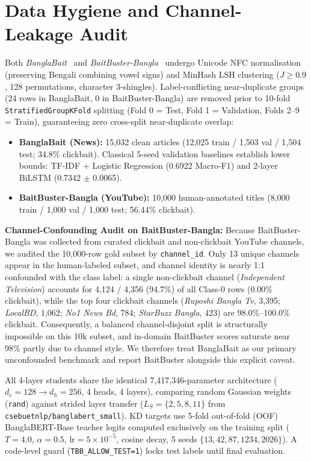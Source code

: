 \documentclass[conference]{IEEEtran}
\begin{document}
\section{Data Hygiene and Channel-Leakage Audit}
Both \textit{BanglaBait}~\cite{mahtab2023banglabait} and \textit{BaitBuster-Bangla}~\cite{alimran2024baitbuster} undergo Unicode NFC normalisation (preserving Bengali combining vowel signs) and MinHash LSH clustering ($J \ge 0.9$, 128 permutations, character 3-shingles). Label-conflicting near-duplicate groups (24 rows in BanglaBait, 0 in BaitBuster-Bangla) are removed prior to 10-fold \texttt{StratifiedGroupKFold} splitting (Fold 0 = Test, Fold 1 = Validation, Folds 2--9 = Train), guaranteeing zero cross-split near-duplicate overlap:
\begin{itemize}
    \item \textbf{BanglaBait (News):} 15,032 clean articles (12,025 train / 1,503 val / 1,504 test; 34.8\% clickbait). Classical 5-seed validation baselines establish lower bounds: TF-IDF + Logistic Regression (0.6922 Macro-F1) and 2-layer BiLSTM (0.7342 $\pm$ 0.0065).
    \item \textbf{BaitBuster-Bangla (YouTube):} 10,000 human-annotated titles (8,000 train / 1,000 val / 1,000 test; 56.44\% clickbait).
\end{itemize}
\textbf{Channel-Confounding Audit on BaitBuster-Bangla:} Because BaitBuster-Bangla was collected from curated clickbait and non-clickbait YouTube channels, we audited the 10,000-row gold subset by \texttt{channel\_id}. Only 13 unique channels appear in the human-labeled subset, and channel identity is nearly 1:1 confounded with the class label: a single non-clickbait channel (\textit{Independent Television}) accounts for 4,124 / 4,356 (94.7\%) of all Class-0 rows (0.00\% clickbait), while the top four clickbait channels (\textit{Ruposhi Bangla Tv}, 3,395; \textit{LocalBD}, 1,062; \textit{No1 News Bd}, 784; \textit{StarBuzz Bangla}, 423) are 98.0\%--100.0\% clickbait. Consequently, a balanced channel-disjoint split is structurally impossible on this 10k subset, and in-domain BaitBuster scores saturate near 98\% partly due to channel style. We therefore treat BanglaBait as our primary unconfounded benchmark and report BaitBuster alongside this explicit caveat.

All 4-layer students share the identical 7,417,346-parameter architecture ($d_e=128 \to d_h=256$, 4 heads, 4 layers), comparing random Gaussian weights (\texttt{rand}) against strided layer transfer ($L_S=\{2,5,8,11\}$ from \texttt{csebuetnlp/banglabert\_small}). KD targets use 5-fold out-of-fold (OOF) BanglaBERT-Base teacher logits computed exclusively on the training split ($T=4.0$, $\alpha=0.5$, $\text{lr}=5\times10^{-5}$, cosine decay, 5 seeds $\{13,42,87,1234,2026\}$). A code-level guard (\texttt{TBB\_ALLOW\_TEST=1}) locks test labels until final evaluation.
\end{document}
